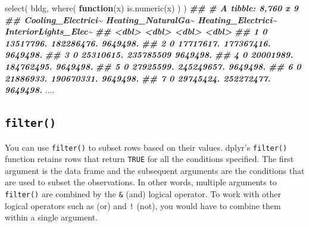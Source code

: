 \documentclass[
]{book}
\newenvironment{Shaded}{\begin{snugshade}}{\end{snugshade}}
\newcommand{\ControlFlowTok}[1]{\textcolor[rgb]{0.13,0.29,0.53}{\textbf{#1}}}
\newcommand{\DocumentationTok}[1]{\textcolor[rgb]{0.56,0.35,0.01}{\textbf{\textit{#1}}}}
\newcommand{\FunctionTok}[1]{\textcolor[rgb]{0.00,0.00,0.00}{#1}}
\newcommand{\NormalTok}[1]{#1}
\begin{document}
\begin{Shaded}
\begin{Highlighting}[]

\FunctionTok{select}\NormalTok{(}
\NormalTok{  bldg,}
  \FunctionTok{where}\NormalTok{(}
    \ControlFlowTok{function}\NormalTok{(x) }\FunctionTok{is.numeric}\NormalTok{(x)}
\NormalTok{  )}
\NormalTok{)}
\DocumentationTok{\#\# \# A tibble: 8,760 x 9}
\DocumentationTok{\#\#    Cooling\_Electrici\textasciitilde{} Heating\_NaturalGa\textasciitilde{} Heating\_Electrici\textasciitilde{} InteriorLights\_Elec\textasciitilde{}}
\DocumentationTok{\#\#                 \textless{}dbl\textgreater{}              \textless{}dbl\textgreater{}              \textless{}dbl\textgreater{}                \textless{}dbl\textgreater{}}
\DocumentationTok{\#\#  1                  0          13517796.         182286476.             9649498.}
\DocumentationTok{\#\#  2                  0          17717617.         177367416.             9649498.}
\DocumentationTok{\#\#  3                  0          25310615.         235785509              9649498.}
\DocumentationTok{\#\#  4                  0          20001989.         184762495.             9649498.}
\DocumentationTok{\#\#  5                  0          27925599.         245249657.             9649498.}
\DocumentationTok{\#\#  6                  0          21886933.         190670331.             9649498.}
\DocumentationTok{\#\#  7                  0          29745424.         252272477.             9649498.}
\NormalTok{....}
\end{Highlighting}
\end{Shaded}

\hypertarget{filter}{%
\subsection{\texorpdfstring{\texttt{filter()}}{filter()}}\label{filter}}

You can use \texttt{filter()} to subset rows based on their values. dplyr's \texttt{filter()} function retains rows that return \texttt{TRUE} for all the conditions specified. The first argument is the data frame and the subsequent arguments are the conditions that are used to subset the observations. In other words, multiple arguments to \texttt{filter()} are combined by the \texttt{\&} (and) logical operator. To work with other logical operators such as \texttt{\textbar{}} (or) and \texttt{!} (not), you would have to combine them within a single argument.
\end{document}
